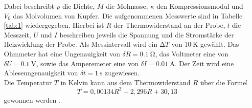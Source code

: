 Dabei beschreibt $\rho$ die Dichte, $M$ die Molmasse, $\kappa$ den Kompressionsmodul und $V_0$ das Molvolumen von Kupfer.
Die aufgenommenen Messwerte sind in Tabelle \ref{tab:1} wiedergegeben.
Hierbei ist $R$ der Thermowiderstand an der Probe, $t$ die Messzeit, $U$ und $I$ beschreiben jeweils die Spannung und die Stromstärke der Heizwicklung der Probe.
Als Messintervall wird ein $\increment T$ von $\SI{10}{\kelvin}$ gewählt.
Das Ohmmeter hat eine Ungenauigkeit von $\delta R = \SI{0.1}{\ohm}$, das Voltmeter eine von $\delta U = \SI{0.1}{\volt}$, sowie das Amperemeter eine von $\delta I = \SI{0.01}{\ampere}$.
Der Zeit wird eine Ableseungenauigkeit von $\delta t = \SI{1}{\second}$ zugewiesen.\\
Die Temperatur $T$ in Kelvin kann aus dem Thermowiderstand $R$ über die Formel
\begin{equation}
  T = 0,00134R^2+2,296R+30,13
\end{equation}
gewonnen werden \cite{skript}.


\newpage

